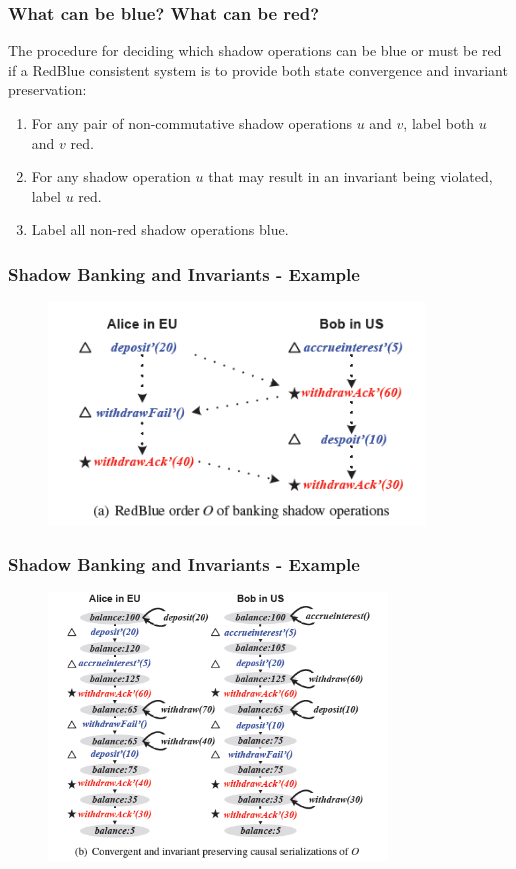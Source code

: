 \documentclass{beamer}
\begin{document}

\begin{frame}
\frametitle{What can be blue? What can be red?}
The procedure for deciding which shadow operations can be blue or must be red if a RedBlue consistent system is to provide both state convergence and invariant preservation:
\begin{enumerate}
\item For any pair of non-commutative shadow operations $u$ and $v$, label both $u$ and $v$ red.
\item For any shadow operation $u$ that may result in an invariant being violated, label $u$ red.
\item Label all non-red shadow operations blue.
\end{enumerate}

\end{frame}


\begin{frame}
\frametitle{Shadow Banking and Invariants - Example}
\begin{figure}[t]
\includegraphics[width=10cm]{pic8.jpg}
\centering
\end{figure}

\end{frame}


\begin{frame}
\frametitle{Shadow Banking and Invariants - Example}
\begin{figure}[t]
\includegraphics[width=9cm]{pic9.jpg}
\centering
\end{figure}

\end{frame}
\end{document}
